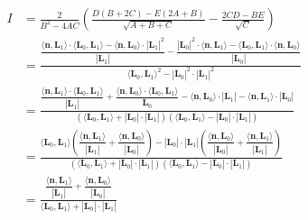\begin{align*}
I &= \frac{2}{B^2-4AC}\left(\frac{D(B + 2C) - E(2A+B)}{\sqrt{A+B+C}} - \frac{2CD - BE}{\sqrt{C}}\right)\\
&= \frac{ \dfrac{\langle\mathbf{n},\mathbf{L}_1\rangle\cdot\langle\mathbf{L}_0,\mathbf{L}_1\rangle - \langle\mathbf{n},\mathbf{L}_0\rangle\cdot|\mathbf{L}_1|^2}{|\mathbf{L}_1|} - \dfrac{|\mathbf{L}_0|^2\cdot\langle\mathbf{n},\mathbf{L}_1\rangle - \langle\mathbf{L}_0,\mathbf{L}_1\rangle\cdot\langle\mathbf{n},\mathbf{L}_0\rangle}{|\mathbf{L}_0|} }{\langle\mathbf{L}_0,\mathbf{L}_1\rangle^2-|\mathbf{L}_0|^2\cdot|\mathbf{L}_1|^2}\\
&= \frac{  \dfrac{\langle\mathbf{n},\mathbf{L}_1\rangle\cdot\langle\mathbf{L}_0,\mathbf{L}_1\rangle}{|\mathbf{L}_1|} + \dfrac{\langle\mathbf{n},\mathbf{L}_0\rangle\cdot\langle\mathbf{L}_0,\mathbf{L}_1\rangle}{\mathbf{L}_0} - \langle\mathbf{n},\mathbf{L}_0\rangle\cdot|\mathbf{L}_1| - \langle\mathbf{n},\mathbf{L}_1\rangle\cdot|\mathbf{L}_0|}{(\langle\mathbf{L}_0,\mathbf{L}_1\rangle+|\mathbf{L}_0|\cdot|\mathbf{L}_1|)(\langle\mathbf{L}_0,\mathbf{L}_1\rangle-|\mathbf{L}_0|\cdot|\mathbf{L}_1|)} \\
&= \frac{\langle\mathbf{L}_0,\mathbf{L}_1\rangle\left(\dfrac{\langle\mathbf{n},\mathbf{L}_1\rangle}{|\mathbf{L}_1|}+\dfrac{\langle\mathbf{n},\mathbf{L}_0\rangle}{|\mathbf{L}_0|}\right) - |\mathbf{L}_0|\cdot|\mathbf{L}_1|\left(\dfrac{\langle\mathbf{n},\mathbf{L}_0\rangle}{|\mathbf{L}_0|}+\dfrac{\langle\mathbf{n},\mathbf{L}_1\rangle}{|\mathbf{L}_1|}\right)}{(\langle\mathbf{L}_0,\mathbf{L}_1\rangle+|\mathbf{L}_0|\cdot|\mathbf{L}_1|)(\langle\mathbf{L}_0,\mathbf{L}_1\rangle-|\mathbf{L}_0|\cdot|\mathbf{L}_1|)} \\
&= \frac{\dfrac{\langle\mathbf{n},\mathbf{L}_1\rangle}{|\mathbf{L}_1|}+\dfrac{\langle\mathbf{n},\mathbf{L}_0\rangle}{|\mathbf{L}_0|} }{\langle\mathbf{L}_0,\mathbf{L}_1\rangle + |\mathbf{L}_0|\cdot|\mathbf{L}_1|}
\end{align*}










